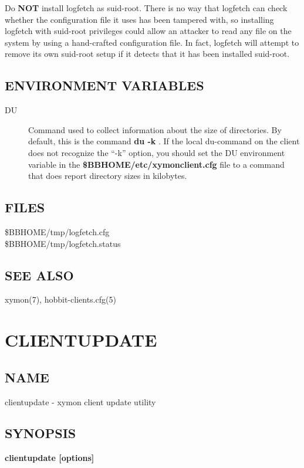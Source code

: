   Do \textbf{NOT}
 install logfetch as suid-root. There is no way that logfetch can check whether the configuration file it uses has been tampered with, so installing logfetch with suid-root privileges could allow an attacker to read any file on the system by using a hand-crafted configuration file. In fact, logfetch will attempt to remove its own suid-root setup if it detects that it has been installed suid-root. 


 
\subsection{ENVIRONMENT VARIABLES}
\begin{description}
\item[DU] Command used to collect information about the size of directories. By default, this is the command \textbf{du -k}
. If the local du-command on the client does not recognize the ``-k'' option, you should set the DU environment variable in the \textbf{\$BBHOME/etc/xymonclient.cfg}
 file to a command that does report directory sizes in kilobytes. 

 


\end{description}
\subsection{FILES}
\begin{description}
\item[\$BBHOME/tmp/logfetch.cfg]
\item[\$BBHOME/tmp/logfetch.status]

 


\end{description}
\subsection{SEE ALSO}
xymon(7), hobbit-clients.cfg(5) 

%
\newpage
\section{CLIENTUPDATE}


\subsection{NAME}
 clientupdate - xymon client update utility \subsection{SYNOPSIS}
\textbf{clientupdate [options]}


